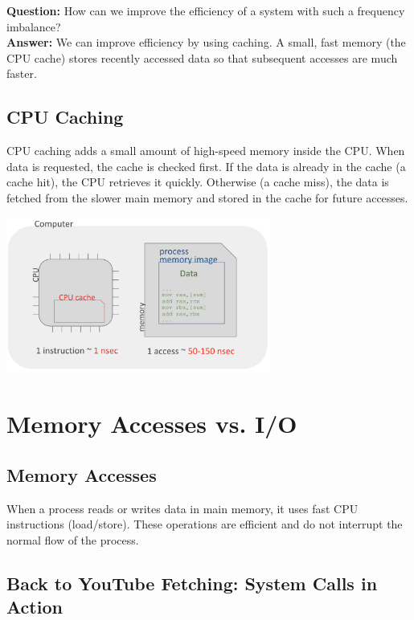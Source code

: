 \vspace{0.5em}
{\textbf{Question:} How can we improve the efficiency of a system with such a frequency imbalance?}\\[0.5em]
\textbf{Answer:} We can improve efficiency by using caching. A small, fast memory (the CPU cache) stores recently accessed data so that subsequent accesses are much faster.

\subsection{CPU Caching}

CPU caching adds a small amount of high-speed memory inside the CPU. When data is requested, the cache is checked first. If the data is already in the cache (a cache hit), the CPU retrieves it quickly. Otherwise (a cache miss), the data is fetched from the slower main memory and stored in the cache for future accesses.

\begin{center}
  \includegraphics[width=0.65\textwidth]{chapters/L1/images/cache.png}
\end{center}

\section{Memory Accesses vs. I/O}

\subsection{Memory Accesses}

When a process reads or writes data in main memory, it uses fast CPU instructions (load/store). These operations are efficient and do not interrupt the normal flow of the process.

\subsection{Back to YouTube Fetching: System Calls in Action}

